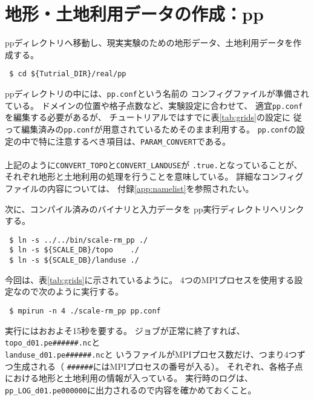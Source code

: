 
\section{地形・土地利用データの作成：pp}

ppディレクトリへ移動し、現実実験のための地形データ、土地利用データを作成する。
\begin{verbatim}
 $ cd ${Tutrial_DIR}/real/pp
\end{verbatim}
ppディレクトリの中には、\verb|pp.conf|という名前の
コンフィグファイルが準備されている。
ドメインの位置や格子点数など、実験設定に合わせて、
適宜\verb|pp.conf|を編集する必要があるが、
チュートリアルではすでに表\ref{tab:grids}の設定に
従って編集済みの\verb|pp.conf|が用意されているためそのまま利用する。
\verb|pp.conf|の設定の中で特に注意するべき項目は、\verb|PARAM_CONVERT|である。\\

\\

\noindent 上記のように\verb|CONVERT_TOPO|と\verb|CONVERT_LANDUSE|が
\verb|.true.|となっていることが、
それぞれ地形と土地利用の処理を行うことを意味している。
詳細なコンフィグファイルの内容については、
付録\ref{app:namelist}を参照されたい。

次に、コンパイル済みのバイナリと入力データを
pp実行ディレクトリへリンクする。
\begin{verbatim}
 $ ln -s ../../bin/scale-rm_pp ./
 $ ln -s ${SCALE_DB}/topo    ./
 $ ln -s ${SCALE_DB}/landuse ./
\end{verbatim}
今回は、表\ref{tab:grids}に示されているように。
4つのMPIプロセスを使用する設定なので次のように実行する。
\begin{verbatim}
 $ mpirun -n 4 ./scale-rm_pp pp.conf
\end{verbatim}
実行にはおおよそ15秒を要する。
ジョブが正常に終了すれば、\verb|topo_d01.pe######.nc|と\\
\verb|landuse_d01.pe######.nc|と
いうファイルがMPIプロセス数だけ、つまり4つずつ生成される（
\verb|######|にはMPIプロセスの番号が入る）。
それぞれ、各格子点における地形と土地利用の情報が入っている。
実行時のログは、\verb|pp_LOG_d01.pe000000|に出力されるので内容を確かめておくこと。


